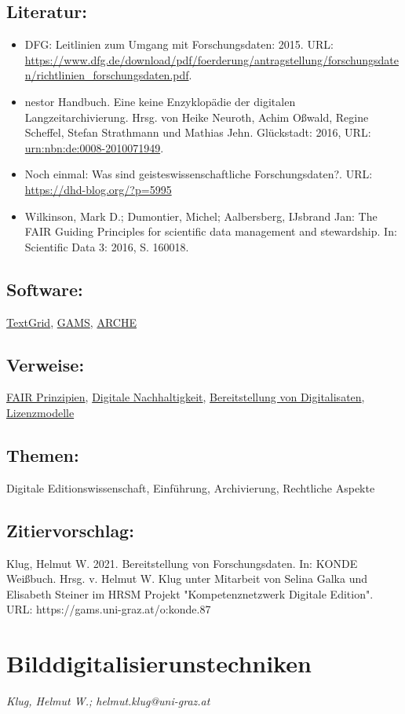 \documentclass{article}
\begin{document}
        \subsection*{Literatur:}\begin{itemize}\item DFG: Leitlinien zum Umgang mit Forschungsdaten: 2015. URL: \url{https://www.dfg.de/download/pdf/foerderung/antragstellung/forschungsdaten/richtlinien_forschungsdaten.pdf}.\item nestor Handbuch. Eine keine Enzyklopädie der digitalen Langzeitarchivierung. Hrsg. von Heike Neuroth, Achim Oßwald, Regine Scheffel, Stefan Strathmann und Mathias Jehn. Glückstadt: 2016, URL: \url{urn:nbn:de:0008-2010071949}.\item Noch einmal: Was sind geisteswissenschaftliche Forschungsdaten?. URL: \url{https://dhd-blog.org/?p=5995}\item Wilkinson, Mark D.; Dumontier, Michel; Aalbersberg, IJsbrand Jan: The FAIR Guiding Principles for scientific data management and stewardship. In: Scientific Data 3: 2016, S. 160018.\end{itemize}\subsection*{Software:}\href{https://textgrid.de/}{TextGrid}, \href{http://gams.uni-graz.at/archive/objects/o:gams.doku/methods/sdef:TEI/get?locale=de}{GAMS}, \href{arche.acdh.oeaw.ac.at/}{ARCHE}\subsection*{Verweise:}\href{https://gams.uni-graz.at/o:konde.7}{FAIR Prinzipien}, \href{https://gams.uni-graz.at/o:konde.6}{Digitale Nachhaltigkeit}, \href{https://gams.uni-graz.at/o:konde.36}{Bereitstellung von Digitalisaten}, \href{https://gams.uni-graz.at/o:konde.9}{Lizenzmodelle}\subsection*{Themen:}Digitale Editionswissenschaft, Einführung, Archivierung, Rechtliche Aspekte\subsection*{Zitiervorschlag:}Klug, Helmut W. 2021. Bereitstellung von Forschungsdaten. In: KONDE Weißbuch. Hrsg. v. Helmut W. Klug unter Mitarbeit von Selina Galka und Elisabeth Steiner im HRSM Projekt "Kompetenznetzwerk Digitale Edition". URL: https://gams.uni-graz.at/o:konde.87\newpage\section*{Bilddigitalisierunstechniken} \emph{Klug, Helmut W.; helmut.klug@uni-graz.at }\\
        
\end{document}
